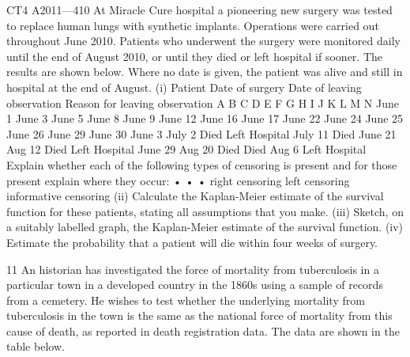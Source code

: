 \documentclass[a4paper,12pt]{article}
\begin{document}
\begin{enumerate}
CT4 A2011—410
At Miracle Cure hospital a pioneering new surgery was tested to replace human lungs with synthetic implants. Operations were carried out throughout June 2010. Patients who underwent the surgery were monitored daily until the end of August 2010, or until they died or left hospital if sooner. The results are shown below. Where no date is given, the patient was alive and still in hospital at the end of August.
(i)
Patient Date of surgery Date of leaving
observation Reason for
leaving
observation
A
B
C
D
E
F
G
H
I
J
K
L
M
N June 1
June 3
June 5
June 8
June 9
June 12
June 16
June 17
June 22
June 24
June 25
June 26
June 29
June 30 June 3
July 2 Died
Left Hospital
July 11 Died
June 21
Aug 12 Died
Left Hospital
June 29
Aug 20 Died
Died
Aug 6 Left Hospital
Explain whether each of the following types of censoring is present and for
those present explain where they occur:
•
•
•
right censoring
left censoring
informative censoring
(ii) Calculate the Kaplan-Meier estimate of the survival function for these patients, stating all assumptions that you make.
(iii) Sketch, on a suitably labelled graph, the Kaplan-Meier estimate of the survival function.
(iv) Estimate the probability that a patient will die within four weeks of surgery.

11
An historian has investigated the force of mortality from tuberculosis in a particular town in a developed country in the 1860s using a sample of records from a cemetery. He wishes to test whether the underlying mortality from tuberculosis in the town is
the same as the national force of mortality from this cause of death, as reported in death registration data. The data are shown in the table below.


\end{enumerate}
\end{document}
